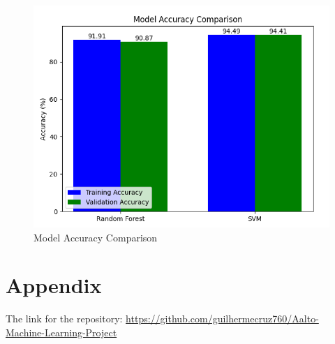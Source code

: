 \documentclass{article}
\begin{document}
\begin{figure}
    \centering
    \includegraphics[width=0.5\linewidth]{Figure_1.png}
    \caption{Model Accuracy Comparison}
    \label{fig:enter-label}
\end{figure}


\printbibliography

\section{Appendix}

The link for the repository: \url{https://github.com/guilhermecruz760/Aalto-Machine-Learning-Project}
\end{document}
